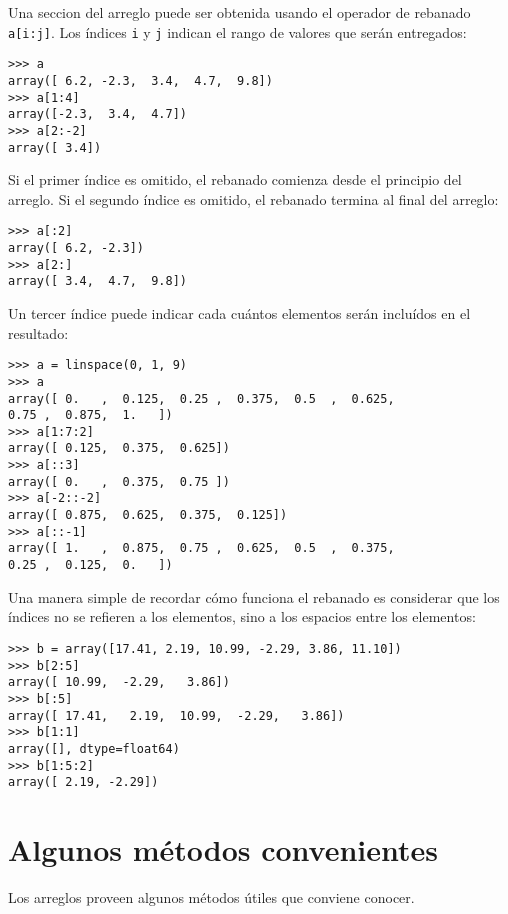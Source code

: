 Una seccion del arreglo puede ser obtenida usando el operador de
rebanado \lstinline!a[i:j]!. Los índices \lstinline!i! y \lstinline!j!
indican el rango de valores que serán entregados:

\begin{lstlisting}
>>> a
array([ 6.2, -2.3,  3.4,  4.7,  9.8])
>>> a[1:4]
array([-2.3,  3.4,  4.7])
>>> a[2:-2]
array([ 3.4])
\end{lstlisting}

Si el primer índice es omitido, el rebanado comienza desde el principio
del arreglo. Si el segundo índice es omitido, el rebanado termina al
final del arreglo:

\begin{lstlisting}
>>> a[:2]
array([ 6.2, -2.3])
>>> a[2:]
array([ 3.4,  4.7,  9.8])
\end{lstlisting}

Un tercer índice puede indicar cada cuántos elementos serán incluídos en
el resultado:

\begin{lstlisting}
>>> a = linspace(0, 1, 9)
>>> a
array([ 0.   ,  0.125,  0.25 ,  0.375,  0.5  ,  0.625,
0.75 ,  0.875,  1.   ])
>>> a[1:7:2]
array([ 0.125,  0.375,  0.625])
>>> a[::3]
array([ 0.   ,  0.375,  0.75 ])
>>> a[-2::-2]
array([ 0.875,  0.625,  0.375,  0.125])
>>> a[::-1]
array([ 1.   ,  0.875,  0.75 ,  0.625,  0.5  ,  0.375,
0.25 ,  0.125,  0.   ])
\end{lstlisting}

Una manera simple de recordar cómo funciona el rebanado es considerar
que los índices no se refieren a los elementos, sino a los espacios
entre los elementos:

\begin{center}
  
\end{center}

\begin{lstlisting}
>>> b = array([17.41, 2.19, 10.99, -2.29, 3.86, 11.10])
>>> b[2:5]
array([ 10.99,  -2.29,   3.86])
>>> b[:5]
array([ 17.41,   2.19,  10.99,  -2.29,   3.86])
>>> b[1:1]
array([], dtype=float64)
>>> b[1:5:2]
array([ 2.19, -2.29])
\end{lstlisting}

\section{Algunos métodos convenientes}

Los arreglos proveen algunos métodos útiles que conviene conocer.

